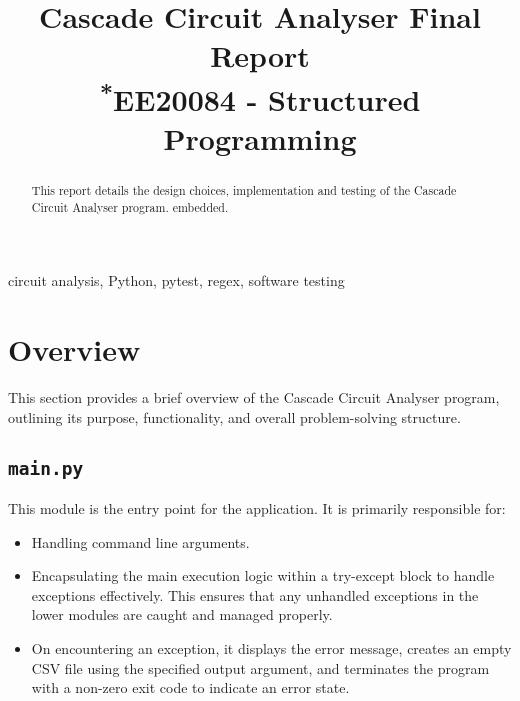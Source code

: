 \documentclass[conference]{IEEEtran}
\begin{document}
\title{Cascade Circuit Analyser Final Report\\
{\footnotesize \textsuperscript{*}EE20084 - Structured Programming}
}

\author{
}
\maketitle

\begin{abstract}
  This report details the design choices, implementation and testing of the Cascade Circuit Analyser program.
  embedded.
\end{abstract}

\begin{IEEEkeywords}
  circuit analysis, Python, pytest, regex, software testing
\end{IEEEkeywords}

\tableofcontents

\section{Overview}
This section provides a brief overview of the Cascade Circuit Analyser program, outlining its purpose, functionality, and overall problem-solving structure.
\subsection{\textbf{\texttt{main.py}}}
This module is the entry point for the application. It is primarily responsible for:
\begin{itemize}
  \item Handling command line arguments.
  \item Encapsulating the main execution logic within a try-except block to handle exceptions effectively. This ensures that any unhandled exceptions in the lower modules are caught and managed properly.
  \item On encountering an exception, it displays the error message, creates an empty CSV file using the specified output argument, and terminates the program with a non-zero exit code to indicate an error state.
\end{itemize}
\end{document}
